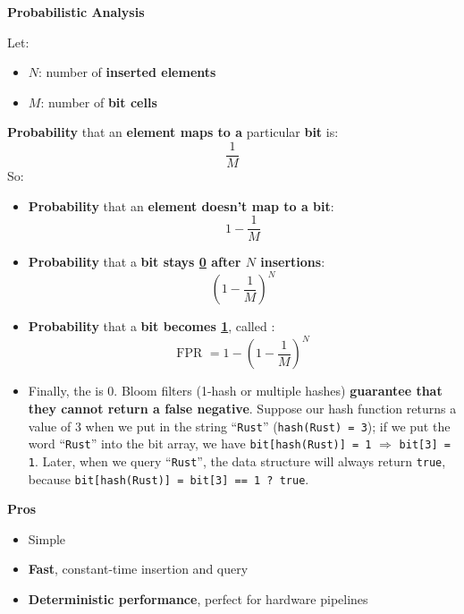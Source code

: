 \highspace
\begin{flushleft}
    \textcolor{Green3}{ \textbf{Probabilistic Analysis}}
\end{flushleft}
Let:
\begin{itemize}
    \item $N$: number of \textbf{inserted elements}
    \item $M$: number of \textbf{bit cells}
\end{itemize}
\textbf{Probability} that an \textbf{element maps to a} particular \textbf{bit} is:
\begin{equation*}
    \dfrac{1}{M}
\end{equation*}
So:
\begin{itemize}
    \item \textbf{Probability} that an \textbf{element doesn't map to a bit}:
    \begin{equation}
        1 - \dfrac{1}{M}
    \end{equation}
    
    \item \textbf{Probability} that a \textbf{bit stays \underline{0} after $N$ insertions}:
    \begin{equation}
        \left(1 - \dfrac{1}{M}\right)^{N}
    \end{equation}
    
    \item \textbf{Probability} that a \textbf{bit becomes \underline{1}}, called :
    \begin{equation}
        \text{FPR } = 1 - \left(1 - \dfrac{1}{M}\right)^{N}
    \end{equation}
    
    \item Finally, the  is 0. Bloom filters (1-hash or multiple hashes) \textbf{guarantee that they cannot return a false negative}. Suppose our hash function returns a value of 3 when we put in the string ``\texttt{Rust}'' (\texttt{hash(Rust) = 3}); if we put the word ``\texttt{Rust}'' into the bit array, we have \texttt{bit[hash(Rust)] = 1} $\Rightarrow$ \texttt{bit[3] = 1}. Later, when we query ``\texttt{Rust}'', the data structure will always return \texttt{true}, because \texttt{bit[hash(Rust)] = bit[3] == 1 ? true}.
\end{itemize}

\highspace
\begin{flushleft}
    \textcolor{Green3}{ \textbf{Pros}}
\end{flushleft}
\begin{itemize}[label=\textcolor{Green3}{}]
    \item Simple
    \item \textbf{Fast}, constant-time insertion and query
    \item \textbf{Deterministic performance}, perfect for hardware pipelines
\end{itemize}

